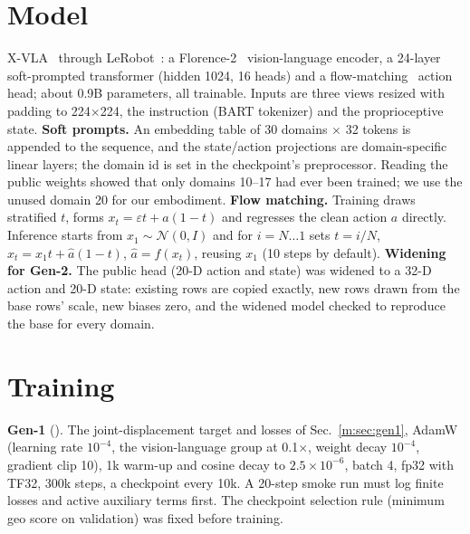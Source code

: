 \documentclass[conference,10pt]{IEEEtran}
\begin{document}
\section{Model}\label{m:sec:model}
X-VLA~\cite{zheng2025xvla} through LeRobot~\cite{cadene2024lerobot}: a Florence-2~\cite{xiao2024florence2} vision-language encoder,
a 24-layer soft-prompted transformer (hidden 1024, 16 heads) and a flow-matching~\cite{lipman2023flow} action head; about 0.9B
parameters, all trainable. Inputs are three views resized with padding to 224$\times$224, the instruction (BART tokenizer) and the
proprioceptive state. \textbf{Soft prompts.} An embedding table of 30 domains $\times$ 32 tokens is appended to the sequence, and the
state/action projections are domain-specific linear layers; the domain id is set in the checkpoint's preprocessor. Reading the
public weights showed that only domains 10--17 had ever been trained; we use the unused domain 20 for our embodiment.
\textbf{Flow matching.} Training draws stratified $t$, forms $x_t=\varepsilon t+a(1-t)$ and regresses the clean action $a$
directly. Inference starts from $x_1\sim\mathcal N(0,I)$ and for $i=N\dots1$ sets $t=i/N$, $x_t=x_1 t+\hat a(1-t)$, $\hat a=f(x_t)$,
reusing $x_1$ (10 steps by default). \textbf{Widening for Gen-2.} The public head (20-D action and state) was widened to a 32-D
action and 20-D state: existing rows are copied exactly, new rows drawn from the base rows' scale, new biases zero, and the widened
model checked to reproduce the base for every domain.

\section{Training}\label{m:sec:train}
\textbf{Gen-1} (). The joint-displacement target and losses of Sec.~\ref{m:sec:gen1}, AdamW (learning
rate $10^{-4}$, the vision-language group at 0.1$\times$, weight decay $10^{-4}$, gradient clip 10), 1k warm-up and cosine decay to
$2.5\times10^{-6}$, batch 4, fp32 with TF32, 300k steps, a checkpoint every 10k. A 20-step smoke run must log finite losses and
active auxiliary terms first. The checkpoint selection rule (minimum geo score on validation) was fixed before training.
\end{document}
